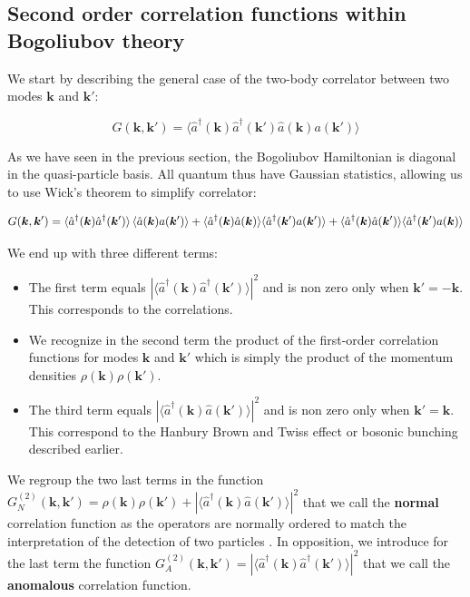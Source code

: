 \subsection{Second order correlation functions within Bogoliubov theory}

We start by describing the general case of the two-body correlator between two modes $\bm{k}$ and $\bm{k'}$:

\begin{equation}
    G(\bm{k},\bm{k}')=\langle \hat{a}^{\dagger}({\bm k}) \hat{a}^{\dagger}({\bm k}') \hat{a}({\bm k}) a({\bm k}') \rangle
\end{equation}

As we have seen in the previous section, the Bogoliubov Hamiltonian is diagonal in the quasi-particle basis. All quantum thus have Gaussian statistics, allowing us to use Wick's theorem to simplify correlator:

\begin{equation}
    G(\bm{k},\bm{k}')=\langle \hat{a}^{\dagger}({\bm k}) \hat{a}^{\dagger}({\bm k}') \rangle \left\langle\hat{a}({\bm k}) a({\bm k}')\right\rangle + \langle \hat{a}^{\dagger}({\bm k}) \hat{a}({\bm k}) \rangle \langle \hat{a}^{\dagger}({\bm k}') a({\bm k}') \rangle + \langle \hat{a}^{\dagger}({\bm k}) \hat{a}({\bm k}') \rangle \langle \hat{a}^{\dagger}({\bm k}') a({\bm k}) \rangle
\end{equation}

We end up with three different terms:

\begin{itemize}
    \item The first term equals $| \langle \hat{a}^{\dagger}({\bm k}) \hat{a}^{\dagger}({\bm k}') \rangle |^2$ and is non zero only when $\bm{k}'=-\bm{k}$. This corresponds to the \kmk correlations.
    \item We recognize in the second term the product of the first-order correlation functions for modes $\bm{k}$ and $\bm{k}'$ which is simply the product of the momentum densities $\rho(\bm{k}) \rho(\bm{k}')$.
    \item The third term equals $| \langle \hat{a}^{\dagger}({\bm k}) \hat{a}({\bm k}') \rangle |^2$ and is non zero only when $\bm{k}'=\bm{k}$. This correspond to the Hanbury Brown and Twiss effect or bosonic bunching described earlier.
\end{itemize}

We regroup the two last terms in the function $G^{(2)}_{N}({\bm k},{\bm k}')= \rho({\bm k})\rho({\bm k}') + | \langle \hat{a}^{\dagger}({\bm k}) \hat{a}({\bm k}') \rangle |^2$ that we call the \textbf{normal} correlation function as the operators are normally ordered to match the interpretation of the detection of two particles . In opposition, we introduce for the last term the function $G^{(2)}_{A}({\bm k},{\bm k}')=| \langle \hat{a}^{\dagger}({\bm k}) \hat{a}^{\dagger}({\bm k}') \rangle |^2 $ that we call the \textbf{anomalous} correlation function. 

